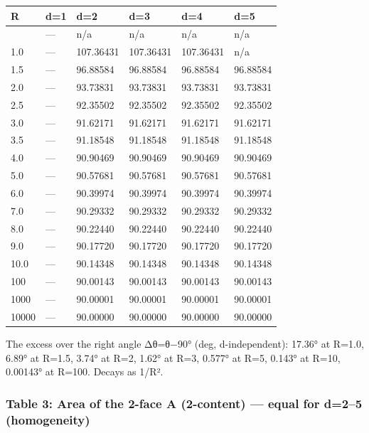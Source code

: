 \documentclass[
]{ltjsarticle}
\newcounter{none} %
\begin{document}
{\def\LTcaptype{none} %
\begin{longtable}[]{@{}llllll@{}}
\toprule\noalign{}
R & d=1 & d=2 & d=3 & d=4 & d=5 \\
\midrule\noalign{}
\endhead
\bottomrule\noalign{}
\endlastfoot
0.5 & --- & n/a & n/a & n/a & n/a \\
1.0 & --- & 107.36431 & 107.36431 & 107.36431 & n/a \\
1.5 & --- & 96.88584 & 96.88584 & 96.88584 & 96.88584 \\
2.0 & --- & 93.73831 & 93.73831 & 93.73831 & 93.73831 \\
2.5 & --- & 92.35502 & 92.35502 & 92.35502 & 92.35502 \\
3.0 & --- & 91.62171 & 91.62171 & 91.62171 & 91.62171 \\
3.5 & --- & 91.18548 & 91.18548 & 91.18548 & 91.18548 \\
4.0 & --- & 90.90469 & 90.90469 & 90.90469 & 90.90469 \\
5.0 & --- & 90.57681 & 90.57681 & 90.57681 & 90.57681 \\
6.0 & --- & 90.39974 & 90.39974 & 90.39974 & 90.39974 \\
7.0 & --- & 90.29332 & 90.29332 & 90.29332 & 90.29332 \\
8.0 & --- & 90.22440 & 90.22440 & 90.22440 & 90.22440 \\
9.0 & --- & 90.17720 & 90.17720 & 90.17720 & 90.17720 \\
10.0 & --- & 90.14348 & 90.14348 & 90.14348 & 90.14348 \\
100 & --- & 90.00143 & 90.00143 & 90.00143 & 90.00143 \\
1000 & --- & 90.00001 & 90.00001 & 90.00001 & 90.00001 \\
10000 & --- & 90.00000 & 90.00000 & 90.00000 & 90.00000 \\
\end{longtable}
}

The excess over the right angle Δθ=θ−90° (deg, d-independent): 17.36° at
R=1.0, 6.89° at R=1.5, 3.74° at R=2, 1.62° at R=3, 0.577° at R=5, 0.143°
at R=10, 0.00143° at R=100. Decays as 1/R².

\subsubsection{Table 3: Area of the 2-face A (2-content) --- equal for
d=2--5
(homogeneity)}\label{table-3-area-of-the-2-face-a-2-content-equal-for-d25-homogeneity}
\end{document}
